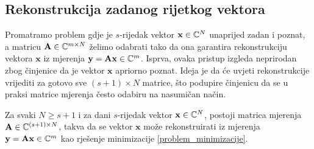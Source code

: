 \documentclass[a4paper,twoside,12pt]{memoir} %
\newcommand{\vect}[1]{\mathbf{#1}}
\renewcommand{\vec}{\vect}
\begin{document}
\subsection[Rekonstrukcija zadanog rijetkog vektora][Rekonstrukcija zadanog rijetkog vektora]{Rekonstrukcija zadanog rijetkog vektora}
Promatramo problem gdje je $s$-rijedak vektor $\vec x \in \C^N$ unaprijed zadan i poznat, a matricu $\vec A \in \C^{m \times N}$ \v{z}elimo odabrati tako da ona garantira rekonstrukciju vektora $\vec x$ iz mjerenja $\vec y = \vec{Ax} \in \C^m$. Isprva, ovaka pristup izgleda neprirodan zbog \v{c}injenice da je vektor $\vec x$ apriorno poznat. Ideja je da \'ce uvjeti rekonstrukcije vrijediti za gotovo sve $(s+1) \times N$ matrice, \v{s}to podupire \v{c}injenicu da se u praksi matrice mjerenja \v{c}esto odabiru na nasumi\v{c}an na\v{c}in.
\begin{thm}
Za svaki $N \geq s + 1$ i za dani $s$-rijedak vektor $\vec x \in \C^N$, postoji matrica mjerenja $\vec A \in \C^{(s+1) \times N}$, takva da se vektor $\vec x$ mo\v{z}e rekonstruirati iz mjerenja $\vec y = \vec{Ax} \in \C^m$ kao rje\v{s}enje minimizacije \eqref{problem_minimizacije}.
\end{thm}
\end{document}

